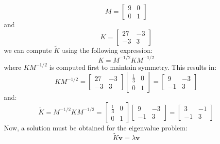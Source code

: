\documentclass[12pt,letter]{article}
\begin{document}
\begin{example}
\begin{equation}
 M = \begin{bmatrix} 9 & 0 \\  0  & 1 \end{bmatrix} 
\end{equation}
and 
\begin{equation}
 K = \begin{bmatrix} 27 & -3 \\    -3  & 3 \end{bmatrix}
\end{equation}
we can compute  $\widetilde{K}$ using the following expression:
\begin{equation}
 \widetilde{K}=M^{-1/2}KM^{-1/2}
\end{equation}
where $KM^{-1/2}$ is computed first to maintain symmetry. This results in:
\begin{equation}
 KM^{-1/2} =  \begin{bmatrix} 27 & -3 \\    -3  & 3 \end{bmatrix}  \begin{bmatrix} \frac{1}{3} & 0 \\    0  & 1 \end{bmatrix}= \begin{bmatrix} 9 & -3 \\    -1  & 3 \end{bmatrix}
\end{equation}
and:
\begin{equation}
 \widetilde{K}=M^{-1/2}KM^{-1/2} =  \begin{bmatrix} \frac{1}{3} & 0 \\    0  & 1 \end{bmatrix} \begin{bmatrix} 9 & -3 \\    -1  & 3 \end{bmatrix} =  \begin{bmatrix} 3 & -1\\  -1  & 3 \end{bmatrix} 
\end{equation}
Now, a solution must be obtained for the eigenvalue problem:
\begin{equation}
\widetilde{K}\textbf{v} =  \lambda \textbf{v}
\end{equation}


\end{example}
\end{document}
